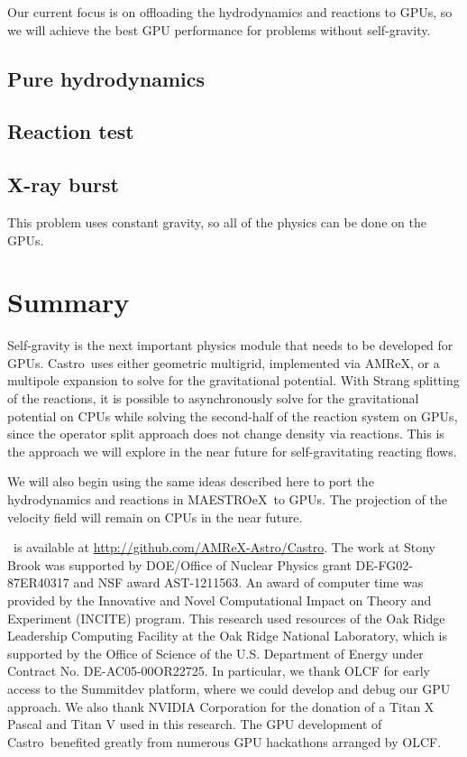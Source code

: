\documentclass[twocolumn,times]{aastex62}
\newcommand{\castro}{{\sf Castro}}
\newcommand{\maestroex}{{\sf MAESTROeX}}
\begin{document}
Our current focus is on offloading the hydrodynamics and reactions to
GPUs, so we will achieve the best GPU performance for problems without
self-gravity.

\subsection{Pure hydrodynamics}

\subsection{Reaction test}

\subsection{X-ray burst}

This problem uses constant gravity, so all of the physics can be done on the GPUs.


\section{Summary}

Self-gravity is the next important physics module that needs to be
developed for GPUs.  \castro\ uses either geometric multigrid,
implemented via AMReX, or a multipole expansion to solve for the
gravitational potential.  With Strang splitting of the reactions, it
is possible to asynchronously solve for the gravitational potential on
CPUs while solving the second-half of the reaction system on GPUs,
since the operator split approach does not change density via
reactions.  This is the approach we will explore in the near future
for self-gravitating reacting flows.

We will also begin using the same ideas described here to port the
hydrodynamics and reactions in \maestroex\ to GPUs.  The projection of
the velocity field will remain on CPUs in the near future.




\acknowledgements \castro\ is available at
\url{http://github.com/AMReX-Astro/Castro}.  The work at Stony Brook
was supported by DOE/Office of Nuclear Physics grant DE-FG02-87ER40317
and NSF award AST-1211563.  An award of computer time was provided by
the Innovative and Novel Computational Impact on Theory and Experiment
(INCITE) program.  This research used resources of the Oak Ridge
Leadership Computing Facility at the Oak Ridge National Laboratory,
which is supported by the Office of Science of the U.S. Department of
Energy under Contract No. DE-AC05-00OR22725.  In particular, we thank
OLCF for early access to the Summitdev platform, where we could
develop and debug our GPU approach.  We also thank NVIDIA Corporation
for the donation of a Titan X Pascal and Titan V used in this
research.  The GPU development of \castro\ benefited greatly from
numerous GPU hackathons arranged by OLCF.







\end{document}
